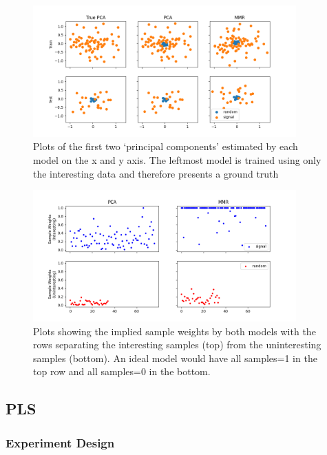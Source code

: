 \begin{figure}[H] 
    \centering
    \includegraphics[width=0.9\textwidth]{chapters/sampleselection/pca/models.png}
    \caption{Plots of the first two `principal components' estimated by each model on the x and y axis. The leftmost model is trained using only the interesting data and therefore presents a ground truth}
    \label{fig:pcalatent}
\end{figure}

\begin{figure}[H] 
    \centering
    \includegraphics[width=0.9\textwidth]{chapters/sampleselection/pca/weights.png}
    \caption{Plots showing the implied sample weights by both models with the rows separating the interesting samples (top) from the uninteresting samples (bottom). An ideal model would have all samples=1 in the top row and all samples=0 in the bottom.}
    \label{fig:pcaweights}
\end{figure}

\subsection{PLS}

\subsubsection{Experiment Design}

